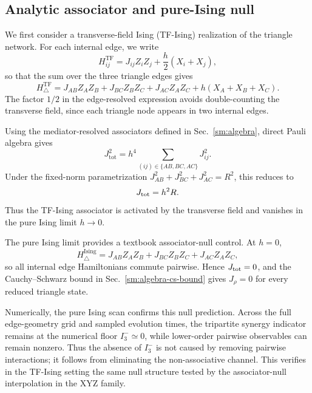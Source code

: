 \documentclass[aps,physrev,preprint,groupedaddress]{revtex4-2}
\begin{document}
\subsection{Analytic associator and pure-Ising null}\label{sm:tfising-analytic-null}
We first consider a transverse-field Ising (TF-Ising) realization of the
triangle network. For each internal edge, we write
\begin{equation}
    H_{ij}^{\mathrm{TF}} = J_{ij}Z_iZ_j + \frac{h}{2}(X_i+X_j),
\end{equation}
so that the sum over the three triangle edges gives
\begin{equation}
    H_{\triangle}^{\mathrm{TF}} = J_{AB}Z_AZ_B+J_{BC}Z_BZ_C+J_{AC}Z_AZ_C+h(X_A+X_B+X_C).
\end{equation}
The factor $1/2$ in the edge-resolved expression avoids double-counting the transverse field, since each triangle node appears in two internal edges.

Using the mediator-resolved associators defined in Sec.~\ref{sm:algebra}, direct Pauli algebra gives
\begin{equation}
    J_{\mathrm{tot}}^2=h^4\sum_{(ij)\in\{AB,BC,AC\}}J_{ij}^2 .
\end{equation}
Under the fixed-norm parametrization $J_{AB}^2+J_{BC}^2+J_{AC}^2=R^2$, this reduces to
\begin{equation}
    J_{\rm tot}=h^2R .
\end{equation}
Thus the TF-Ising associator is activated by the transverse field and vanishes in the pure Ising limit $h\to 0$.

The pure Ising limit provides a textbook associator-null control. At $h=0$,
\begin{equation}
    H_{\triangle}^{\mathrm{Ising}}=J_{AB}Z_AZ_B+J_{BC}Z_BZ_C+J_{AC}Z_AZ_C,
\end{equation}
so all internal edge Hamiltonians commute pairwise. Hence $J_{\rm tot}=0$, and the Cauchy--Schwarz bound in Sec.~\ref{sm:algebra-cs-bound} gives $J_\rho=0$ for every reduced
triangle state.

Numerically, the pure Ising scan confirms this null prediction. Across the full edge-geometry grid and sampled evolution times, the tripartite synergy indicator remains at the numerical floor $I_3^-\simeq 0$, while lower-order pairwise observables can remain nonzero. Thus the
absence of $I_3^-$ is not caused by removing pairwise interactions; it follows from eliminating the non-associative channel. This verifies in the TF-Ising setting the same null structure tested by the associator-null interpolation in the XYZ family.
\end{document}
